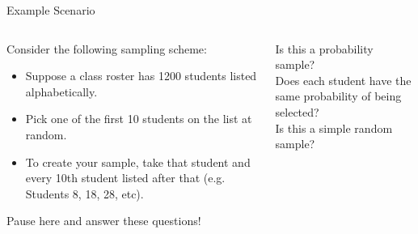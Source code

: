 \documentclass[aspectratio=169]{../latex_main/tntbeamer}  %
\begin{document}
	
	
		\begin{frame}{Example Scenario}
	    \begin{columns}
	        \begin{column}{.3\textwidth}
	            Consider the following sampling scheme:

	            \begin{itemize}
	                \item Suppose a class roster has 1200 students listed alphabetically.
	                \item Pick one of the first 10 students on the list at random.
	                \item To create your sample, take that student and every 10th student listed after that (e.g. Students 8, 18, 28, etc).
	            \end{itemize}
	            Pause here and answer these questions!
                 
	        \end{column}
	        
	        \begin{column}{.6\textwidth}
	           Is this a probability sample?\\
	           \bigskip
	           Does each student have the same probability of being selected?\\
	           \bigskip
	           Is this a simple random sample?


	        \end{column}
	        
	    \end{columns}
	    
	\end{frame}
	
\end{document}
